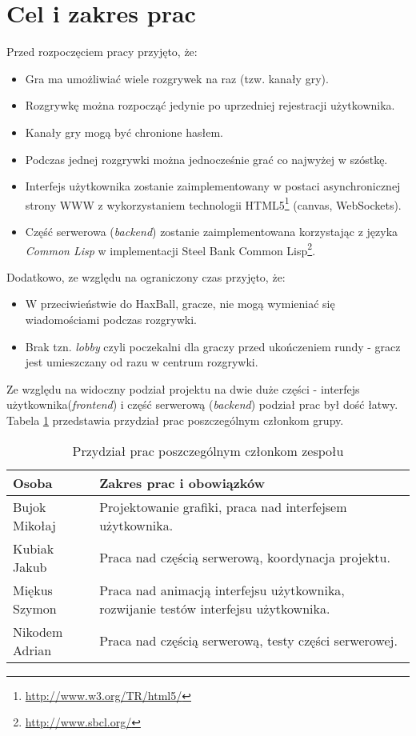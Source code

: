 \section{Cel i zakres prac}
Przed rozpoczęciem pracy przyjęto, że:
\begin{itemize}
\itemsep0em
  \item Gra ma umożliwiać wiele rozgrywek na raz (tzw. kanały gry).
  \item Rozgrywkę można rozpocząć jedynie po uprzedniej rejestracji użytkownika.
  \item Kanały gry mogą być chronione hasłem.
  \item Podczas jednej rozgrywki można jednocześnie grać co najwyżej w szóstkę.
  \item Interfejs użytkownika zostanie zaimplementowany w postaci asynchronicznej strony WWW z wykorzystaniem technologii HTML5\footnote{\url{http://www.w3.org/TR/html5/}} (canvas, WebSockets).
  \item Część serwerowa (\emph{backend}) zostanie zaimplementowana korzystając z języka \emph{Common Lisp} w implementacji Steel Bank Common Lisp\footnote{\url{http://www.sbcl.org/}}.
\end{itemize}

Dodatkowo, ze względu na ograniczony czas przyjęto, że:
\begin{itemize}
  \item W przeciwieństwie do HaxBall, gracze, nie mogą wymieniać się wiadomościami podczas rozgrywki.
  \item Brak tzn. \emph{lobby} czyli poczekalni dla graczy przed ukończeniem rundy - gracz jest umieszczany od razu w centrum rozgrywki.
\end{itemize}

Ze względu na widoczny podział projektu na dwie duże części - interfejs użytkownika(\emph{frontend}) i część serwerową (\emph{backend}) podział prac był dość łatwy. Tabela \ref{tab:podzia} przedstawia przydział prac poszczególnym członkom grupy.

\begin{table}[h]
  \centering
  \begin{tabular}{ |l|p{8cm}| }
    \hline
    Osoba & Zakres prac i obowiązków \\ \hline
    Bujok Mikołaj &

    Projektowanie grafiki, praca nad interfejsem użytkownika.\\
    Kubiak Jakub & Praca nad częścią serwerową, koordynacja projektu.\\
    Miękus Szymon & Praca nad animacją interfejsu użytkownika, rozwijanie testów interfejsu użytkownika. \\
    Nikodem Adrian &  Praca nad częścią serwerową, testy części serwerowej.\\
    \hline
  \end{tabular}
  \caption{Przydział prac poszczególnym członkom zespołu}
  \label{tab:podzia}
\end{table}
